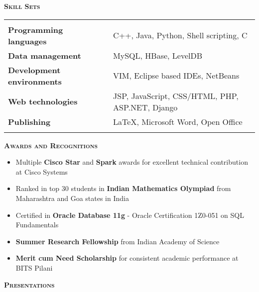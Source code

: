 \documentclass[11pt]{article}
\begin{document}
\begin{mdframed}[backgroundcolor=light-gray, linecolor=light-gray, roundcorner=10pt, shadow=false, shadowsize=1pt]
\Large{\textbf{\textsc{Skill Sets}}}
\end{mdframed}
\begin{tabular}{l  c  l}
 & \\
\textbf{Programming languages} & & \quad C++, Java, Python, Shell scripting, C\\
\textbf{Data management} & & \quad MySQL, HBase, LevelDB\\
\textbf{Development environments} & & \quad VIM, Eclipse based IDEs, NetBeans\\
\textbf{Web technologies} & & \quad JSP, JavaScript, CSS/HTML, PHP, ASP.NET, Django\\
\textbf{Publishing} & & \quad \LaTeX, Microsoft Word, Open Office\\ \\
\end{tabular}
\begin{mdframed}[backgroundcolor=light-gray, linecolor=light-gray, roundcorner=10pt, shadow=false, shadowsize=1pt]
\Large{\textbf{\textsc{Awards and Recognitions}}}
\end{mdframed}
\begin{itemize}\addtolength{\itemsep}{-0.5\baselineskip}
	\item{Multiple \textbf{Cisco Star} and \textbf{Spark} awards for excellent technical contribution at Cisco Systems}
	\item{Ranked in top 30 students in \textbf{Indian Mathematics Olympiad} from Maharashtra and Goa states in India}
	\item{Certified in \textbf{Oracle Database 11g} - Oracle Certification 1Z0-051 on SQL Fundamentals}
	\item{\textbf{Summer Research Fellowship} from Indian Academy of Science}
	\item{\textbf{Merit cum Need Scholarship} for consistent academic performance at BITS Pilani}
\end{itemize}
\begin{mdframed}[backgroundcolor=light-gray, linecolor=light-gray, roundcorner=10pt, shadow=false, shadowsize=1pt]
\Large{\textbf{\textsc{Presentations}}}
\end{mdframed}
\end{document}
